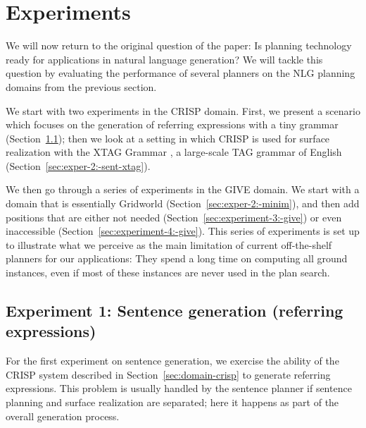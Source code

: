 \section{Experiments}
\label{sec:experiments}

We will now return to the original question of the paper: Is planning
technology ready for applications in natural language generation? We
will tackle this question by evaluating the performance of several
planners on the NLG planning domains from the previous section.

We start with two experiments in the CRISP domain. First, we present a
scenario which focuses on the generation of referring expressions with
a tiny grammar (Section~\ref{sec:exper-1:-sent}); then we look at a
setting in which CRISP is used for surface realization with the XTAG
Grammar \citep{xtag01:_tr}, a large-scale TAG grammar of English
(Section~\ref{sec:exper-2:-sent-xtag}).

We then go through a series of experiments in the GIVE domain. We
start with a domain that is essentially Gridworld
(Section~\ref{sec:exper-2:-minim}), and then add positions that are
either not needed (Section~\ref{sec:experiment-3:-give}) or even
inaccessible (Section~\ref{sec:experiment-4:-give}). This series of
experiments is set up to illustrate what we perceive as the main
limitation of current off-the-shelf planners for our applications:
They spend a long time on computing all ground instances, even if most
of these instances are never used in the plan search. 



\subsection{Experiment 1: Sentence generation (referring expressions)}
\label{sec:exper-1:-sent}

For the first experiment on sentence generation, we exercise the
ability of the CRISP system described in
Section~\ref{sec:domain-crisp} to generate referring expressions. This
problem is usually handled by the sentence planner if sentence
planning and surface realization are separated; here it happens as
part of the overall generation process. 

